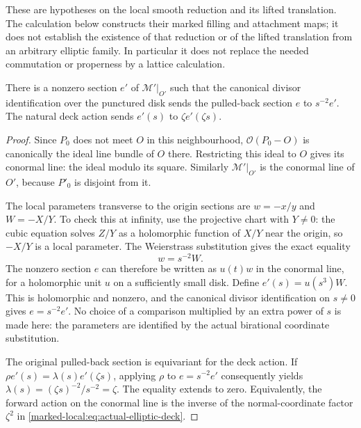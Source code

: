 These are hypotheses on the local smooth reduction and its lifted
translation. The calculation below constructs their marked filling
and attachment maps; it does not establish the existence of that
reduction or of the lifted translation from an arbitrary elliptic
family. In particular it does not replace the needed commutation
or properness by a lattice calculation.

\begin{lemma}\label{marked-local:lem:conormal-comparison}
There is a nonzero section $e'$ of $\mathcal M'|_{O'}$ such that
the canonical divisor identification over the punctured disk sends
the pulled-back section $e$ to $s^{-2}e'$. The natural deck action
sends $e'(s)$ to $\zeta e'(\zeta s)$.
\end{lemma}
\begin{proof}
Since $P_0$ does not meet $O$ in this neighbourhood,
$\mathcal O(P_0-O)$ is canonically the ideal line bundle of $O$
there. Restricting this ideal to $O$ gives its conormal line:
the ideal modulo its square. Similarly $\mathcal M'|_{O'}$ is
the conormal line of $O'$, because $P'_0$ is disjoint from it.

The local parameters transverse to the origin sections are
$w=-x/y$ and $W=-X/Y$. To check this at infinity, use the
projective chart with $Y\ne0$: the cubic equation solves $Z/Y$
as a holomorphic function of $X/Y$ near the origin, so $-X/Y$
is a local parameter. The Weierstrass substitution gives the
exact equality
\begin{equation}\label{marked-local:eq:conormal-coordinate}
                         w=s^{-2}W.
\end{equation}
The nonzero section $e$ can therefore be written as $u(t)w$ in
the conormal line, for a holomorphic unit $u$ on a sufficiently
small disk. Define $e'(s)=u(s^3)W$. This is holomorphic and
nonzero, and the canonical divisor identification on $s\ne0$
gives $e=s^{-2}e'$. No choice of a comparison multiplied by an
extra power of $s$ is made here: the parameters are identified
by the actual birational coordinate substitution.

The original pulled-back section is equivariant for the deck
action. If $\rho e'(s)=\lambda(s)e'(\zeta s)$, applying $\rho$
to $e=s^{-2}e'$ consequently yields
$\lambda(s)=(\zeta s)^{-2}/s^{-2}=\zeta$.
The equality extends to zero. Equivalently, the forward action on
the conormal line is the inverse of the normal-coordinate factor
$\zeta^2$ in \eqref{marked-local:eq:actual-elliptic-deck}.
\end{proof}

